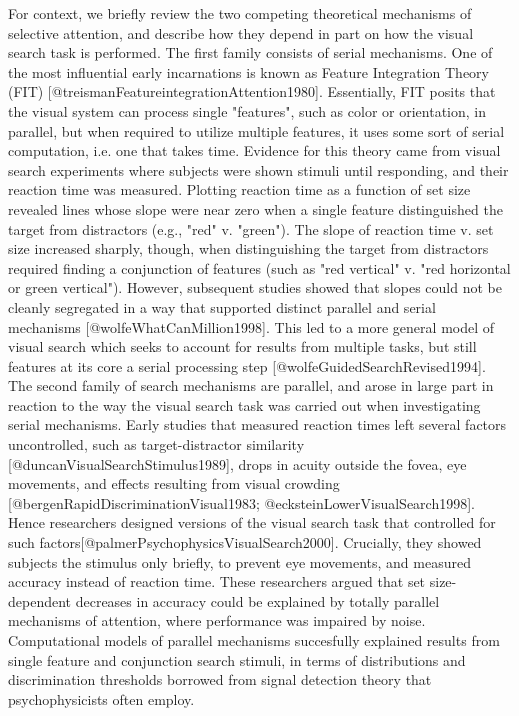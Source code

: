 \documentclass[10pt,letterpaper]{article}
\begin{document}
For context, we briefly review the two competing theoretical mechanisms of selective 
attention, and describe how they depend in part on how the visual search task is 
performed. The first family consists of serial mechanisms. One of the most influential 
early incarnations is known as Feature Integration Theory (FIT) 
[@treismanFeatureintegrationAttention1980]. Essentially, FIT posits that the visual system
can process single "features", such as color or orientation, in parallel, but when 
required to utilize multiple features, it uses some sort of serial computation, i.e. one 
that takes time. Evidence for this theory came from visual search experiments where 
subjects were shown stimuli until responding, and their reaction time was measured. 
Plotting reaction time as a function of set size revealed 
lines whose slope were near zero when a single feature distinguished the target from 
distractors (e.g., "red" v. "green"). The slope of reaction time v. set size increased 
sharply, though, when distinguishing the target from distractors required finding a 
conjunction of features (such as "red vertical" v. "red horizontal or green vertical"). 
However, subsequent studies showed that slopes could not be cleanly segregated in a way 
that supported distinct parallel and serial mechanisms [@wolfeWhatCanMillion1998]. This 
led to a more general model of visual search which seeks to account for results from 
multiple tasks, but still features at its core a serial processing step
[@wolfeGuidedSearchRevised1994].
The second family of search mechanisms are parallel, and arose in large part in reaction 
to the way the visual search task was carried out when investigating
serial mechanisms. Early studies that measured reaction times left several factors 
uncontrolled, such as target-distractor similarity [@duncanVisualSearchStimulus1989], 
drops in acuity outside the fovea, eye movements, and effects resulting from visual 
crowding [@bergenRapidDiscriminationVisual1983; @ecksteinLowerVisualSearch1998]. 
Hence researchers designed versions of the visual search task that controlled for such 
factors[@palmerPsychophysicsVisualSearch2000]. Crucially, they showed subjects the 
stimulus only briefly, to prevent eye movements, and measured accuracy instead of reaction
time. These researchers argued that set size-dependent decreases in accuracy could be 
explained by totally parallel mechanisms of attention, where performance was impaired by 
noise. Computational models of parallel mechanisms succesfully explained results from 
single feature and conjunction search stimuli, in terms of distributions and 
discrimination thresholds borrowed from signal detection theory that psychophysicists 
often employ.
\end{document}
